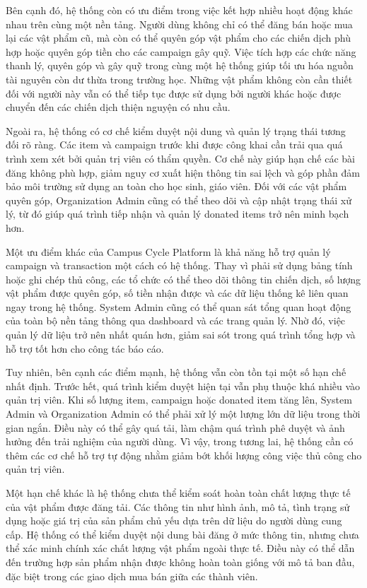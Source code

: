\documentclass[12pt,a4paper]{report}
\begin{document}
Bên cạnh đó, hệ thống còn có ưu điểm trong việc kết hợp nhiều hoạt động khác nhau trên cùng một nền tảng. Người dùng không chỉ có thể đăng bán hoặc mua lại các vật phẩm cũ, mà còn có thể quyên góp vật phẩm cho các chiến dịch phù hợp hoặc quyên góp tiền cho các campaign gây quỹ. Việc tích hợp các chức năng thanh lý, quyên góp và gây quỹ trong cùng một hệ thống giúp tối ưu hóa nguồn tài nguyên còn dư thừa trong trường học. Những vật phẩm không còn cần thiết đối với người này vẫn có thể tiếp tục được sử dụng bởi người khác hoặc được chuyển đến các chiến dịch thiện nguyện có nhu cầu.

Ngoài ra, hệ thống có cơ chế kiểm duyệt nội dung và quản lý trạng thái tương đối rõ ràng. Các item và campaign trước khi được công khai cần trải qua quá trình xem xét bởi quản trị viên có thẩm quyền. Cơ chế này giúp hạn chế các bài đăng không phù hợp, giảm nguy cơ xuất hiện thông tin sai lệch và góp phần đảm bảo môi trường sử dụng an toàn cho học sinh, giáo viên. Đối với các vật phẩm quyên góp, Organization Admin cũng có thể theo dõi và cập nhật trạng thái xử lý, từ đó giúp quá trình tiếp nhận và quản lý donated items trở nên minh bạch hơn.

Một ưu điểm khác của Campus Cycle Platform là khả năng hỗ trợ quản lý campaign và transaction một cách có hệ thống. Thay vì phải sử dụng bảng tính hoặc ghi chép thủ công, các tổ chức có thể theo dõi thông tin chiến dịch, số lượng vật phẩm được quyên góp, số tiền nhận được và các dữ liệu thống kê liên quan ngay trong hệ thống. System Admin cũng có thể quan sát tổng quan hoạt động của toàn bộ nền tảng thông qua dashboard và các trang quản lý. Nhờ đó, việc quản lý dữ liệu trở nên nhất quán hơn, giảm sai sót trong quá trình tổng hợp và hỗ trợ tốt hơn cho công tác báo cáo.

Tuy nhiên, bên cạnh các điểm mạnh, hệ thống vẫn còn tồn tại một số hạn chế nhất định. Trước hết, quá trình kiểm duyệt hiện tại vẫn phụ thuộc khá nhiều vào quản trị viên. Khi số lượng item, campaign hoặc donated item tăng lên, System Admin và Organization Admin có thể phải xử lý một lượng lớn dữ liệu trong thời gian ngắn. Điều này có thể gây quá tải, làm chậm quá trình phê duyệt và ảnh hưởng đến trải nghiệm của người dùng. Vì vậy, trong tương lai, hệ thống cần có thêm các cơ chế hỗ trợ tự động nhằm giảm bớt khối lượng công việc thủ công cho quản trị viên.

Một hạn chế khác là hệ thống chưa thể kiểm soát hoàn toàn chất lượng thực tế của vật phẩm được đăng tải. Các thông tin như hình ảnh, mô tả, tình trạng sử dụng hoặc giá trị của sản phẩm chủ yếu dựa trên dữ liệu do người dùng cung cấp. Hệ thống có thể kiểm duyệt nội dung bài đăng ở mức thông tin, nhưng chưa thể xác minh chính xác chất lượng vật phẩm ngoài thực tế. Điều này có thể dẫn đến trường hợp sản phẩm nhận được không hoàn toàn giống với mô tả ban đầu, đặc biệt trong các giao dịch mua bán giữa các thành viên.
\end{document}
